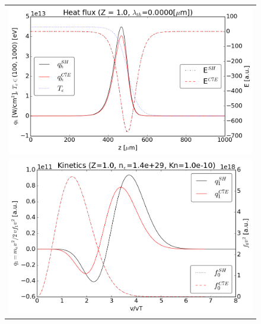 \documentclass[preprint,12pt]{elsarticle}
\begin{document}
\begin{figure}[tbh]
  \begin{center}
    \begin{tabular}{c}
      \includegraphics[width=1.0\textwidth]{../results/fe_analysis/C7E/P5_heatflux_Z1_Kn1e-10.png} \\ 
      \includegraphics[width=1.0\textwidth]{../results/fe_analysis/C7E/P5_kinetics_Z1_Kn1e-10.png}
    \end{tabular}
  \caption{
  }
  \end{center}
  \label{fig:AWBScorrection_f1}
\end{figure}
\end{document}
